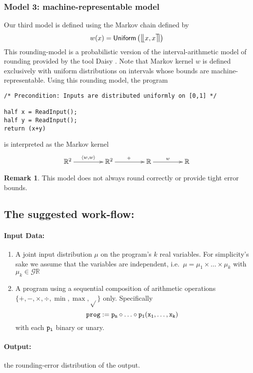 \documentclass[10pt,a4paper]{article}
\theoremstyle{plain}
\theoremstyle{definition}
\newtheorem{remark}[theorem]{Remark}
\newcommand{\ie}{i.e.\ }
\newcommand{\R}{\mathbb{R}}
\newcommand{\Unif}{\mathsf{Uniform}}
\newcommand{\Giry}{\mathcal{G}}
\newcommand{\ffintvl}[1][x]{\mathlarger{\llfloor}#1,#1\mathlarger{\rrceil}}
\begin{document}
\subsubsection{Model 3: machine-representable model}

Our third model is defined using the Markov chain defined by
\[
w(x)=\Unif\left(\ffintvl\right)
\]
This rounding-model is a probabilistic version of the interval-arithmetic model of rounding provided by the tool Daisy \cite{darulova2018daisy}. Note that Markov kernel $w$ is defined exclusively with uniform distributions on intervals whose bounds are machine-representable. Using this rounding model, the program 
\begin{lstlisting}
/* Precondition: Inputs are distributed uniformly on [0,1] */

half x = ReadInput();
half y = ReadInput();
return (x+y) 
\end{lstlisting}
is interpreted as the Markov kernel
\[
\xymatrix@C=10ex
{
\R^2 \ar[r]^{\langle w,w\rangle} & \R^2\ar[r]^{+} & \R\ar[r]^{w} & \R
}
\]

\begin{remark}
This model does not always round correctly or provide tight error bounds.
\end{remark}

\subsection{The suggested work-flow:}

\paragraph{Input Data:}
\begin{enumerate}
\item A joint input distribution $\mu$ on the program's $k$ real variables. For simplicity's sake we assume that the variables are independent, \ie $\mu=\mu_1\times\ldots\times \mu_k$ with $\mu_k\in\Giry\R$ 
\item A program using a sequential composition of arithmetic operations $\{+,-,\times,\div,\min,\max,\sqrt{}\}$ only. Specifically
\[
\tt{prog:=p_n\circ\ldots\circ p_1 (x_1,\ldots,x_k)}
\]
with each $\tt{p}_i$ binary or unary.
\end{enumerate} 

\paragraph{Output:} the rounding-error distribution of the output.
\end{document}
